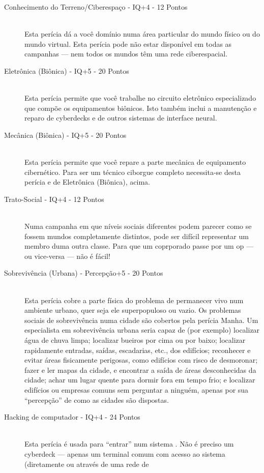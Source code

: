 \documentclass[a4paper]{article}
\begin{document}
\begin{description}
\begin{description}
    \item[Conhecimento do Terreno/Ciberespaço - IQ+4 - 12 Pontos] \hfill \\ Esta perícia dá a você domínio numa área particular do mundo físico ou do mundo virtual. Esta perícia pode não estar disponível em todas as campanhas — nem todos os mundos têm uma rede ciberespacial.
    \item[Eletrônica (Biônica) - IQ+5 - 20 Pontos] \hfill \\ Esta perícia permite que você trabalhe no circuito eletrônico
especializado que compõe os equipamentos biônicos. Isto também
inclui a manutenção e reparo de cyberdecks e de outros sistemas
de interface neural.
    \item[Mecânica (Biônica) - IQ+5 - 20 Pontos] \hfill \\ Esta perícia permite que você repare a parte mecânica de
equipamento cibernético. Para ser um técnico ciborgue completo
necessita-se desta perícia e de Eletrônica (Biônica), acima.
    \item[Trato-Social - IQ+4 - 12 Pontos] \hfill \\ Numa campanha em que níveis sociais diferentes podem
parecer como se fossem mundos completamente distintos, pode
ser difícil representar um membro duma outra classe. Para que um coprporado passe por um op — ou vice-versa — não é fácil!
    \item[Sobrevivência (Urbana) - Percepção+5 - 20 Pontos] \hfill \\ Esta perícia cobre a parte física do problema de permanecer
vivo num ambiente urbano, quer seja ele superpopuloso ou
vazio. Os problemas sociais de sobrevivência numa cidade são
cobertos pela perícia Manha. Um especialista em sobrevivência
urbana seria capaz de (por exemplo) localizar água de chuva
limpa; localizar bueiros por cima ou por baixo; localizar
rapidamente entradas, saídas, escadarias, etc., dos edifícios;
reconhecer e evitar áreas fisicamente perigosas, como edifícios
com risco de desmoronar; fazer e ler mapas da cidade, e
encontrar a saída de áreas desconhecidas da cidade; achar um
lugar quente para dormir fora em tempo frio; e localizar edifícios
ou empresas comuns sem perguntar a ninguém, apenas por sua
“percepção” de como as cidades são dispostas.
    \item[Hacking de computador - IQ+4 - 24 Pontos] \hfill \\ Esta perícia é usada para “entrar” num sistema . Não é preciso um cyberdeck — apenas um terminal comum com acesso ao sistema (diretamente ou através de uma rede de

\end{description}
\end{description}
\end{document}
